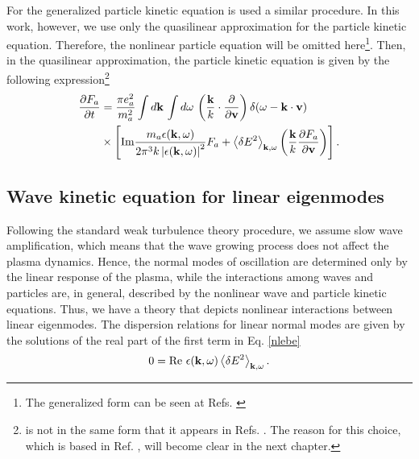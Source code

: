 \documentclass[12pt,a4paper,ruledheader]{report}
\begin{document}
For the generalized particle kinetic equation is used a similar
procedure. In this work, however, we use only the quasilinear
approximation for the particle kinetic equation. Therefore, the
nonlinear particle equation will be omitted here\footnote{The
generalized form can be seen at Refs. \cite{Yoon00,Tigik2015}}.
Then, in the quasilinear approximation, the particle kinetic equation
is given by the following expression\footnote{
  is not in the same form that it appears in Refs. \cite{Yoon00,Tigik2015}.
  The reason for this choice, which is based in Ref. \cite{YZKS16},
  will become clear in the next chapter.} \cite{YZKS16}
\begin{equation}
  \begin{split}
  \frac{\partial F_a}{\partial t}&=\frac{\pi e_a^2}{m_a^2}
  \int d{\bf k}\, \int d\omega\,
  \left( \frac{\bf k}{k}\cdot \frac{\partial}{\partial {\bf v}}\right)
  \delta(\omega -{\bf k \cdot v})\\
  &\times\left[\mbox{Im} \frac{m_a \epsilon({\bf k},\omega)}
    {2\pi^3k \left|\epsilon ({\bf k},\omega) \right|^2 } F_a
  +\left<\delta E^2\right>_{{\bf k},\omega}
\left( \frac{\bf k}{k}\frac{\partial F_a}{\partial \bf v} \right)  \right].
  \end{split}
\label{part}
\end{equation}

\subsection{Wave kinetic equation for linear eigenmodes}
Following the standard weak turbulence theory procedure, we assume
slow wave amplification, which means that
the wave growing process
does not affect the plasma dynamics. Hence, the normal modes
of oscillation are determined only by the linear response of
the plasma, while the interactions among waves and particles
are, in general, described by the nonlinear wave and particle
kinetic equations. Thus, we have a theory that depicts nonlinear
interactions between linear eigenmodes. The dispersion relations
for linear normal modes are given by the solutions of the real
part of the first term in Eq. \eqref{nlebe}
\begin{equation}
  0=\mbox{Re}\ \epsilon({\bf k},\omega)\left<\delta E^2 \right>_{{\bf k},\omega}.
  \label{real-lin}
\end{equation}
\end{document}
